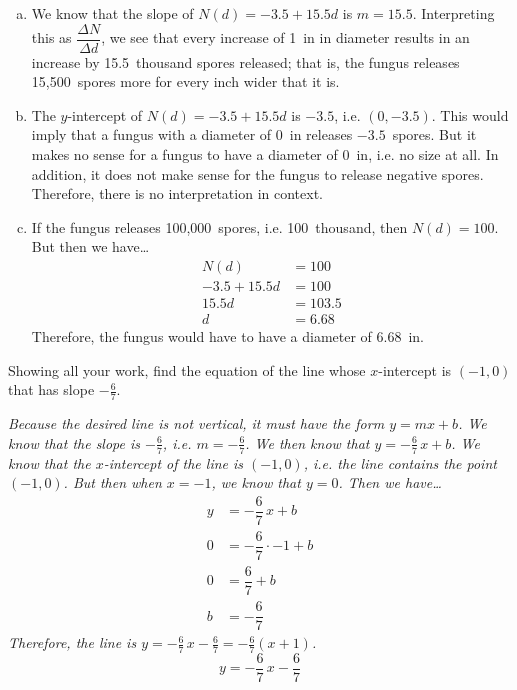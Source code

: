 \documentclass[12pt,letterpaper]{exam}
\begin{document}
\begin{questions}
{\itshape
\sol
\begin{enumerate}[(a)]
\item We know that the slope of $N(d)= -3.5 + 15.5d$ is $m= 15.5$. Interpreting this as $\dfrac{\Delta N}{\Delta d}$, we see that every increase of 1~in in diameter results in an increase by 15.5~thousand spores released; that is, the fungus releases 15,500~spores more for every inch wider that it is. \pspace

\item The $y$-intercept of $N(d)= -3.5 + 15.5d$ is $-3.5$, i.e. $(0, -3.5)$. This would imply that a fungus with a diameter of 0~in releases $-3.5$~spores. But it makes no sense for a fungus to have a diameter of 0~in, i.e. no size at all. In addition, it does not make sense for the fungus to release negative spores. Therefore, there is no interpretation in context. \pspace

\item If the fungus releases 100,000~spores, i.e. 100~thousand, then $N(d)= 100$. But then we have\dots
	\[
	\begin{aligned}
	N(d)&= 100 \\[0.3cm]
	-3.5 + 15.5d&= 100 \\[0.3cm]
	15.5d&= 103.5 \\[0.3cm]
	d&= 6.68
	\end{aligned}
	\]
Therefore, the fungus would have to have a diameter of 6.68~in. 
\end{enumerate}
}



\newpage
\question[10] Showing all your work, find the equation of the line whose $x$-intercept is $(-1, 0)$ that has slope $-\frac{6}{7}$. \pspace

{\noindent \itshape Because the desired line is not vertical, it must have the form $y= mx + b$. We know that the slope is $-\frac{6}{7}$, i.e. $m= -\frac{6}{7}$. We then know that $y= -\frac{6}{7}\,x + b$. We know that the $x$-intercept of the line is $(-1, 0)$, i.e. the line contains the point $(-1, 0)$. But then when $x= -1$, we know that $y= 0$. Then we have\dots
	\[
	\begin{aligned}
	y&= -\dfrac{6}{7}\,x + b \\[0.3cm]
	0&= -\dfrac{6}{7} \cdot -1 + b \\[0.3cm]
	0&= \dfrac{6}{7} + b \\[0.3cm]
	b&= -\dfrac{6}{7}
	\end{aligned}
	\]
Therefore, the line is $y= -\frac{6}{7}\,x - \frac{6}{7}= -\frac{6}{7} (x + 1)$. 
	\[
	\boxed{y= -\dfrac{6}{7}\,x - \dfrac{6}{7}}
	\]
}




\end{questions}
\end{document}
